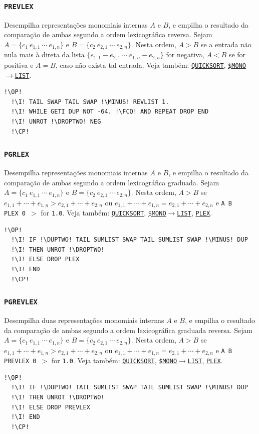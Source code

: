 \documentclass[12pt,a4paper]{report}
\newcommand{\kwd}[1]{\texttt{\textcolor{keyword}{#1}}}
\newcommand{\I}{\enspace\textcolor{indent}\vrule\hspace{2pt}}
\newcommand{\DROPTWO}{\kwd{DROP2}}   %
\newcommand{\DUPTWO}{\kwd{DUP2}}   %
\newcommand{\GREATER}{\kwd{$>$}}   %
\newcommand{\MINUS}{\kwd{-}}   %
\newcommand{\FCQ}{\kwd{FC?}} %
\newcommand{\QUICKSORT}{\kwd{QUICKSORT}}   %
\newcommand{\PLEX}{\kwd{PLEX}}   %
\newcommand{\PREVLEX}{\kwd{PREVLEX}}   %
\newcommand{\PGRLEX}{\kwd{PGRLEX}}   %
\newcommand{\PGREVLEX}{\kwd{PGREVLEX}}   %
\newcommand{\SMONOTOLIST}{\kwd{\$MONO{$\rightarrow$}LIST}}   %
\newcommand{\OP}{\kwd{$\ll$}}   %
\newcommand{\CP}{\kwd{$\gg$}}   %
\numberwithin{theorem}{chapter}
\begin{document}
\subsubsection{\PREVLEX}\label{PREVLEX}
Desempilha representações monomiais internas \(A\) e \(B\), e empilha
o resultado da comparação de ambas segundo a ordem lexicográfica
reversa.  Sejam \(A = \{c_1\ e_{1,1}\ \cdots\ e_{1,n}\}\) e \(B =
\{c_2\ e_{2,1}\ \cdots\ e_{2,n}\}\).  Nesta ordem, \(A > B\) se a
entrada não nula mais à direta da lista
\(\{e_{1,1}-e_{2,1}\ \cdots\ e_{1,n}-e_{2,n}\}\) for negativa, \(A <
B\) se for positiva e \(A = B\), caso não exista tal entrada.  Veja
também: \hyperref[QUICKSORT]{\QUICKSORT},
\hyperref[SMONOTOLIST]{\SMONOTOLIST}.
\begin{lstlisting}[language=userrpl]
  !\OP!
  !\I! TAIL SWAP TAIL SWAP !\MINUS! REVLIST 1.
  !\I! WHILE GETI DUP NOT -64. !\FCQ! AND REPEAT DROP END
  !\I! UNROT !\DROPTWO! NEG
  !\CP!
\end{lstlisting}

\subsubsection{\PGRLEX}\label{PGRLEX}
Desempilha representações monomiais internas \(A\) e \(B\), e empilha
o resultado da comparação de ambas segundo a ordem lexicográfica
graduada.  Sejam \(A = \{c_1\ e_{1,1}\ \cdots\ e_{1,n}\}\) e \(B =
\{c_2\ e_{2,1}\ \cdots\ e_{2,n}\}\).  Nesta ordem, \(A > B\) se
\(e_{1,1} + \cdots + e_{1,n} > e_{2,1} + \cdots + e_{2,n}\) ou
\(e_{1,1} + \cdots + e_{1,n} = e_{2,1} + \cdots + e_{2,n}\) e
\texttt{A B \PLEX\ 0 \GREATER} for \texttt{1.0}.  Veja também:
\hyperref[QUICKSORT]{\QUICKSORT},
\hyperref[SMONOTOLIST]{\SMONOTOLIST}, \hyperref[PLEX]{\PLEX}.
\begin{lstlisting}[language=userrpl]
  !\OP!
  !\I! IF !\DUPTWO! TAIL SUMLIST SWAP TAIL SUMLIST SWAP !\MINUS! DUP
  !\I! THEN UNROT !\DROPTWO!
  !\I! ELSE DROP PLEX
  !\I! END
  !\CP!
\end{lstlisting}

\subsubsection{\PGREVLEX}\label{PGREVLEX}
Desempilha duas representações monomiais internas \(A\) e \(B\), e
empilha o resultado da comparação de ambas segundo a ordem
lexicográfica graduada reversa.  Sejam \(A =
\{c_1\ e_{1,1}\ \cdots\ e_{1,n}\}\) e \(B =
\{c_2\ e_{2,1}\ \cdots\ e_{2,n}\}\).  Nesta ordem, \(A > B\) se
\(e_{1,1} + \cdots + e_{1,n} > e_{2,1} + \cdots + e_{2,n}\) ou
\(e_{1,1} + \cdots + e_{1,n} = e_{2,1} + \cdots + e_{2,n}\) e
\texttt{A B \PREVLEX\ 0 \GREATER} for \texttt{1.0}.  Veja também:
\hyperref[QUICKSORT]{\QUICKSORT},
\hyperref[SMONOTOLIST]{\SMONOTOLIST}, \hyperref[PLEX]{\PLEX}.
\begin{lstlisting}[language=userrpl]
  !\OP!
  !\I! IF !\DUPTWO! TAIL SUMLIST SWAP TAIL SUMLIST SWAP !\MINUS! DUP
  !\I! THEN UNROT !\DROPTWO!
  !\I! ELSE DROP PREVLEX
  !\I! END
  !\CP!
\end{lstlisting}
\end{document}
